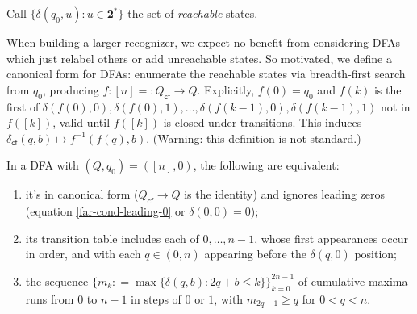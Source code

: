 Call $\{\delta(q_0,u): u\in\mathbf{2}^*\}$ the set of \emph{reachable} states.

When building a larger recognizer,
we expect no benefit from considering DFAs which just relabel others or add unreachable states.
So motivated, we define a canonical form for DFAs:
enumerate the reachable states via breadth-first search from $q_0$,
producing $f:[n]=\mathrel{\mathop:}Q_\textsf{cf}\to Q$.
Explicitly,
$f(0)=q_0$ and $f(k)$ is the first of
$\delta(f(0),0), \delta(f(0),1), \ldots, \delta(f(k-1),0), \delta(f(k-1),1)$ not in $f([k])$,
valid until $f([k])$ is closed under transitions.
This induces $\delta_\textsf{cf}(q,b)\mapsto f^{-1}(f(q), b)$.
(Warning: this definition is not standard.)

\begin{lemma}
  \label{far-dfa-canonical form}
  In a DFA with $(Q,q_0)=([n],0)$, the following are equivalent:
  \begin{enumerate}
    \item it's in canonical form ($Q_\textsf{cf}\to Q$ is the identity)
          and ignores leading zeros (equation \eqref{far-cond-leading-0} or $\delta(0,0)=0$);
    \item its transition table includes each of $0,\ldots,n-1$, whose first appearances occur in order,
          and with each $q\in(0,n)$ appearing before the $\delta(q,0)$ position;
    \item the sequence $\{m_k \mathrel{\mathop:}= \max\{\delta(q,b): 2q+b\le k\}\}_{k=0}^{2n-1}$ of cumulative maxima runs from $0$ to $n-1$ in steps of $0$ or $1$,
          with $m_{2q-1}\ge q$ for $0<q<n$.
  \end{enumerate}
\end{lemma}
\proof
